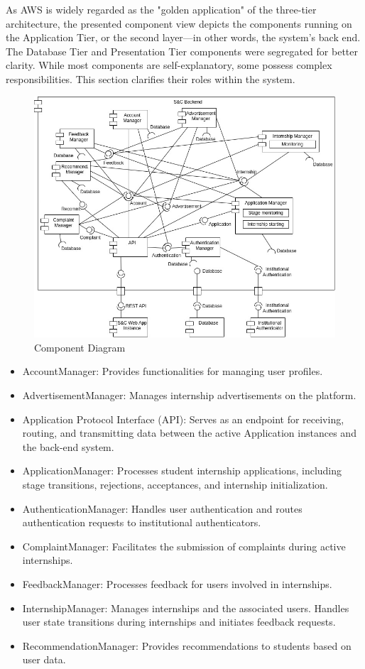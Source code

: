 As AWS is widely regarded as the "golden application" of the three-tier architecture, the presented component view depicts the components running on the Application Tier, or the second layer—in other words, the system's back end. The Database Tier and Presentation Tier components were segregated for better clarity. While most components are self-explanatory, some possess complex responsibilities. This section clarifies their roles within the system.

\begin{figure} [h]
    \centering 
    \includegraphics[width=0.9\linewidth]{DD-Latex/assets/Component Diagram/Component Diagram.jpg} 
    \caption{Component Diagram} \label{fig:Component Diagram} 
\end{figure}

\sloppy
\begin{itemize}
    \item AccountManager: Provides functionalities for managing user profiles.
    \item AdvertisementManager: Manages internship advertisements on the platform.
    \item Application Protocol Interface (API): Serves as an endpoint for receiving, routing, and transmitting data between the active Application instances and the back-end system.
    \item ApplicationManager: Processes student internship applications, including stage transitions, rejections, acceptances, and internship initialization.
    \item AuthenticationManager: Handles user authentication and routes authentication requests to institutional authenticators.
    \item ComplaintManager: Facilitates the submission of complaints during active internships.
    \item FeedbackManager: Processes feedback for users involved in internships.
    \item InternshipManager: Manages internships and the associated users. Handles user state transitions during internships and initiates feedback requests.
    \item RecommendationManager: Provides recommendations to students based on user data.
\end{itemize}

